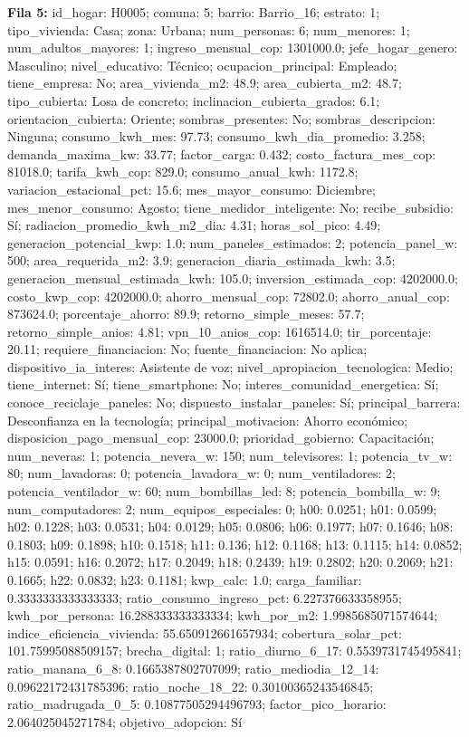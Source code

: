 {\footnotesize\textbf{Fila 5:} id\_hogar: H0005; comuna: 5; barrio: Barrio\_16; estrato: 1; tipo\_vivienda: Casa; zona: Urbana; num\_personas: 6; num\_menores: 1; num\_adultos\_mayores: 1; ingreso\_mensual\_cop: 1301000.0; jefe\_hogar\_genero: Masculino; nivel\_educativo: Técnico; ocupacion\_principal: Empleado; tiene\_empresa: No; area\_vivienda\_m2: 48.9; area\_cubierta\_m2: 48.7; tipo\_cubierta: Losa de concreto; inclinacion\_cubierta\_grados: 6.1; orientacion\_cubierta: Oriente; sombras\_presentes: No; sombras\_descripcion: Ninguna; consumo\_kwh\_mes: 97.73; consumo\_kwh\_dia\_promedio: 3.258; demanda\_maxima\_kw: 33.77; factor\_carga: 0.432; costo\_factura\_mes\_cop: 81018.0; tarifa\_kwh\_cop: 829.0; consumo\_anual\_kwh: 1172.8; variacion\_estacional\_pct: 15.6; mes\_mayor\_consumo: Diciembre; mes\_menor\_consumo: Agosto; tiene\_medidor\_inteligente: No; recibe\_subsidio: Sí; radiacion\_promedio\_kwh\_m2\_dia: 4.31; horas\_sol\_pico: 4.49; generacion\_potencial\_kwp: 1.0; num\_paneles\_estimados: 2; potencia\_panel\_w: 500; area\_requerida\_m2: 3.9; generacion\_diaria\_estimada\_kwh: 3.5; generacion\_mensual\_estimada\_kwh: 105.0; inversion\_estimada\_cop: 4202000.0; costo\_kwp\_cop: 4202000.0; ahorro\_mensual\_cop: 72802.0; ahorro\_anual\_cop: 873624.0; porcentaje\_ahorro: 89.9; retorno\_simple\_meses: 57.7; retorno\_simple\_anios: 4.81; vpn\_10\_anios\_cop: 1616514.0; tir\_porcentaje: 20.11; requiere\_financiacion: No; fuente\_financiacion: No aplica; dispositivo\_ia\_interes: Asistente de voz; nivel\_apropiacion\_tecnologica: Medio; tiene\_internet: Sí; tiene\_smartphone: No; interes\_comunidad\_energetica: Sí; conoce\_reciclaje\_paneles: No; dispuesto\_instalar\_paneles: Sí; principal\_barrera: Desconfianza en la tecnología; principal\_motivacion: Ahorro económico; disposicion\_pago\_mensual\_cop: 23000.0; prioridad\_gobierno: Capacitación; num\_neveras: 1; potencia\_nevera\_w: 150; num\_televisores: 1; potencia\_tv\_w: 80; num\_lavadoras: 0; potencia\_lavadora\_w: 0; num\_ventiladores: 2; potencia\_ventilador\_w: 60; num\_bombillas\_led: 8; potencia\_bombilla\_w: 9; num\_computadores: 2; num\_equipos\_especiales: 0; h00: 0.0251; h01: 0.0599; h02: 0.1228; h03: 0.0531; h04: 0.0129; h05: 0.0806; h06: 0.1977; h07: 0.1646; h08: 0.1803; h09: 0.1898; h10: 0.1518; h11: 0.136; h12: 0.1168; h13: 0.1115; h14: 0.0852; h15: 0.0591; h16: 0.2072; h17: 0.2049; h18: 0.2439; h19: 0.2802; h20: 0.2069; h21: 0.1665; h22: 0.0832; h23: 0.1181; kwp\_calc: 1.0; carga\_familiar: 0.3333333333333333; ratio\_consumo\_ingreso\_pct: 6.227376633358955; kwh\_por\_persona: 16.288333333333334; kwh\_por\_m2: 1.9985685071574644; indice\_eficiencia\_vivienda: 55.650912661657934; cobertura\_solar\_pct: 101.75995088509157; brecha\_digital: 1; ratio\_diurno\_6\_17: 0.5539731745495841; ratio\_manana\_6\_8: 0.1665387802707099; ratio\_mediodia\_12\_14: 0.09622172431785396; ratio\_noche\_18\_22: 0.30100365243546845; ratio\_madrugada\_0\_5: 0.10877505294496793; factor\_pico\_horario: 2.064025045271784; objetivo\_adopcion: Sí\par}
